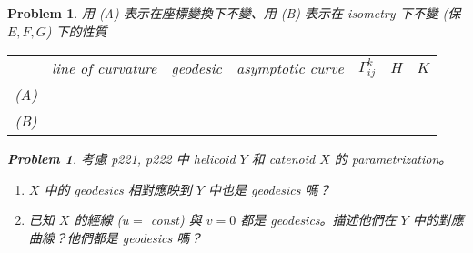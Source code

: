 \documentclass[10pt,a4paper]{article}
\newcounter{theProblemCounter}
\newtheorem{problem}[theProblemCounter]{Problem}
\begin{document}
\setcounter{theProblemCounter}{7}
\begin{problem}
用 (A) 表示在座標變換下不變、用 (B) 表示在 isometry 下不變 (保 $E, F, G$) 下的性質

\begin{tabular}{c|c|c|c|c|c|c|}
\cline{2-7}
 & line of curvature & geodesic & asymptotic curve & $\Gamma^{k}_{ij}$ & $H$ & $K$ \\
\cline{2-7}
(A) & & & & & & \\
\cline{2-7}
(B) & & & & & & \\
\cline{2-7}
\end{tabular}

\setcounter{theProblemCounter}{8}
\begin{problem}
考慮 p221, p222 中 helicoid $Y$ 和 catenoid $X$ 的 parametrization。
\begin{enumerate}
\item[(a)] $X$ 中的 geodesics 相對應映到 $Y$ 中也是 geodesics 嗎？
\item[(b)] 已知 $X$ 的經線 ($u = $ const) 與 $v=0$ 都是 geodesics。描述他們在 $Y$ 中的對應曲線？他們都是 geodesics 嗎？
\end{enumerate}
\end{problem}

\end{problem}
\end{document}

